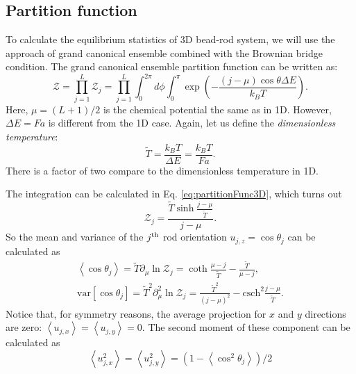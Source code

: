 \subsection{Partition function}
\label{sub:partition_function}
To calculate the equilibrium statistics of 3D bead-rod system, we will use the approach of grand canonical ensemble combined with the Brownian bridge condition. The grand canonical ensemble partition function can be written as:
\begin{equation}
    \label{eq:partitionFunc3D}
    \mathcal{Z} = \prod_{j=1}^L \mathcal{Z}_j = \prod_{j=1}^L \int_{0}^{2\pi} d\phi \int_{0}^{\pi}\exp\left(-\frac{(j-\mu)\cos\theta\Delta E}{k_BT}\right).
\end{equation}
Here, $\mu=(L+1)/2$ is the chemical potential the same as in 1D. However, $\Delta E = Fa$ is different from the 1D case. Again, let us define the \emph{dimensionless temperature}:
\begin{equation}
    \tilde{T} = \frac{k_B T}{\Delta E} = \frac{k_B T}{Fa}.
\end{equation}
There is a factor of two compare to the dimensionless temperature in 1D.

The integration can be calculated in Eq. \eqref{eq:partitionFunc3D}, which turns out
\begin{equation}
    \label{eq:partitionFuncRod}
    \mathcal{Z}_j = \frac{\tilde{T}\sinh\frac{j-\mu}{\tilde{T}}}{j - \mu}.
\end{equation}
So the mean and variance of the $j^{\rm{th}}$ rod orientation $u_{j,z} = \cos\theta_j$ can be calculated as
\begin{equation}
    \begin{aligned}
    \label{eq:meanVarRod}
    \left<\cos\theta_j\right> = \tilde{T}\partial_{\mu}\ln\mathcal{Z}_j = \coth\frac{\mu - j}{\tilde{T}}-\frac{\tilde{T}}{\mu-j}, \\
    \text{var}\left[\cos\theta_j\right] = \tilde{T}^2\partial_{\mu}^2\ln\mathcal{Z}_j = \frac{\tilde{T}^2}{(j-\mu)^2} - \text{csch}^2\frac{j-\mu}{\tilde{T}}.
    \end{aligned}
\end{equation}
Notice that, for symmetry reasons, the average projection for $x$ and $y$ directions are zero: $\left<u_{j,x}\right> = \left<u_{j,y}\right> = 0$. The second moment of these component can be calculated as
\begin{equation}
    \label{eq:second_moment}
    \left<u_{j,x}^2\right> = \left<u_{j,y}^2\right> = (1-\left<\cos^2\theta_j\right>)/2
\end{equation}

